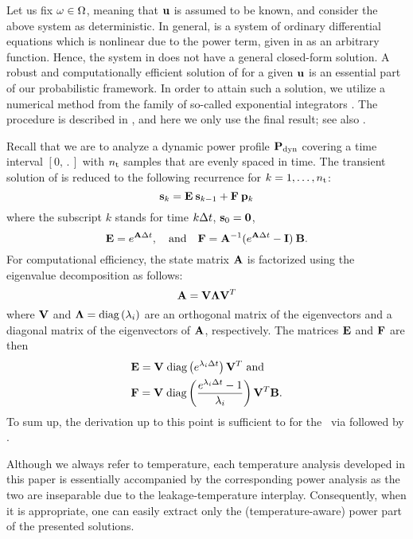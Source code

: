 Let us fix $\omega \in \Omega$, meaning that $\mathbf{u}$ is assumed to be known, and consider the above system as deterministic.
In general,  is a system of ordinary differential equations which is nonlinear due to the power term, given in  as an arbitrary function.
Hence, the system in  does not have a general closed-form solution.
A robust and computationally efficient solution of  for a given $\mathbf{u}$ is an essential part of our probabilistic framework.
In order to attain such a solution, we utilize a numerical method from the family of so-called exponential integrators \cite{hochbruck2010}.
The procedure is described in , and here we only use the final result; see also \cite{ukhov2012}.

Recall that we are to analyze a dynamic power profile $\mathbf{P}_{\text{dyn}}$ covering a time interval $[0, \period]$ with ${n_\text{t}}$ samples that are evenly spaced in time.
The transient solution of  is reduced to the following recurrence for $k = 1, \dots, {n_\text{t}}$:
\begin{equation} \elab{recurrence}
  \vs_k = \mE \: \vs_{k - 1} + \mF \: \vp_k
\end{equation}
where the subscript $k$ stands for time $k \Delta t$, $\mathbf{s}_0 = \mathbf{0}$,
\[
  \mathbf{E} = e^{\mathbf{A} \Delta t}, \hspace{1em} \text{and} \hspace{1em} \mathbf{F} = \mathbf{A}^{-1} (e^{\mathbf{A} \Delta t} - \mathbf{I}) \: \mathbf{B}.
\]
For computational efficiency, the state matrix $\mathbf{A}$ is factorized using the eigenvalue decomposition as follows:
\begin{equation} \elab{eigenvalue-decomposition}
  \mA = \mV \mL \mV^T
\end{equation}
where $\mathbf{V}$ and $\mathbf{\Lambda} = \text{diag}\left( \lambda_i \right)$ are an orthogonal matrix of the eigenvectors and a diagonal matrix of the eigenvectors of $\mathbf{A}$, respectively.
The matrices $\mathbf{E}$ and $\mathbf{F}$ are then
\begin{align*}
  & \mathbf{E} = \mathbf{V} \; \text{diag}\left( e^{\lambda_i \Delta t} \right) \mathbf{V}^T \text{ and} \\
  & \mathbf{F} = \mathbf{V} \; \text{diag}\left(  \frac{e^{\lambda_i \Delta t} - 1}{\lambda_i}  \right) \mathbf{V}^T \mathbf{B}.
\end{align*}
To sum up, the derivation up to this point is sufficient to for the \tta\ via  followed by .
\begin{remark}
Although we always refer to temperature, each temperature analysis developed in this paper is essentially accompanied by the corresponding power analysis as the two are inseparable due to the leakage-temperature interplay.
Consequently, when it is appropriate, one can easily extract only the (temperature-aware) power part of the presented solutions.
\end{remark}


